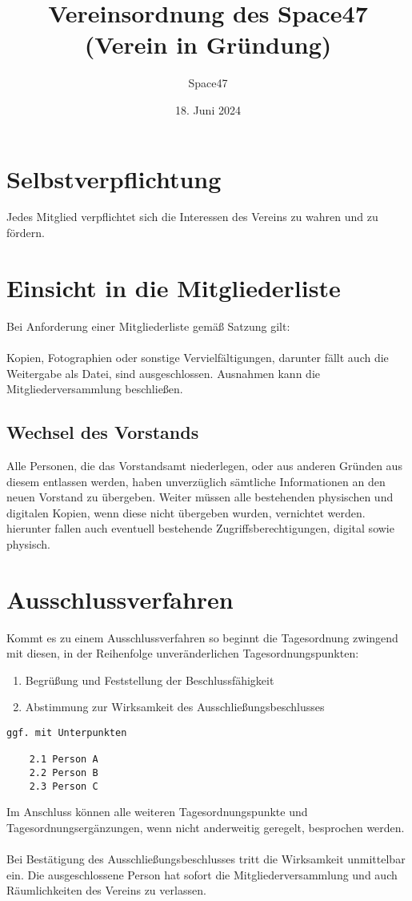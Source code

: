 \documentclass[a4paper]{article}
\title{Vereinsordnung des Space47 (Verein in Gründung)}
\author{Space47}
\date{18. Juni 2024}
\begin{document}
\maketitle

\section{Selbstverpflichtung}
Jedes Mitglied verpflichtet sich die Interessen des Vereins zu wahren und zu fördern.

\section{Einsicht in die Mitgliederliste}
Bei Anforderung einer Mitgliederliste gemäß Satzung gilt: \\ \\
Kopien, Fotographien oder sonstige Vervielfältigungen, darunter fällt auch die Weitergabe als Datei, sind ausgeschlossen. Ausnahmen kann die Mitgliederversammlung beschließen.

\subsection{Wechsel des Vorstands}
Alle Personen, die das Vorstandsamt niederlegen, oder aus anderen Gründen aus diesem entlassen werden, haben unverzüglich sämtliche Informationen an den neuen Vorstand zu übergeben. Weiter müssen alle bestehenden physischen und digitalen Kopien, wenn diese nicht übergeben wurden, vernichtet werden. hierunter fallen auch eventuell bestehende Zugriffsberechtigungen, digital sowie physisch.

\pagebreak

\section{Ausschlussverfahren}
Kommt es zu einem Ausschlussverfahren so beginnt die Tagesordnung zwingend mit diesen, in der Reihenfolge unveränderlichen Tagesordnungspunkten:
\begin{enumerate}[1.]
    \item Begrüßung und Feststellung der Beschlussfähigkeit
    \item Abstimmung zur Wirksamkeit des Ausschließungsbeschlusses
\end{enumerate}
\begin{verbatim}
ggf. mit Unterpunkten

    2.1 Person A
    2.2 Person B
    2.3 Person C
\end{verbatim}
Im Anschluss können alle weiteren Tagesordnungspunkte und Tagesordnungsergänzungen, wenn nicht anderweitig geregelt, besprochen werden. \\ \\
Bei Bestätigung des Ausschließungsbeschlusses tritt die Wirksamkeit unmittelbar ein. Die ausgeschlossene Person hat sofort die Mitgliederversammlung und auch Räumlichkeiten des Vereins zu verlassen.
\end{document}
